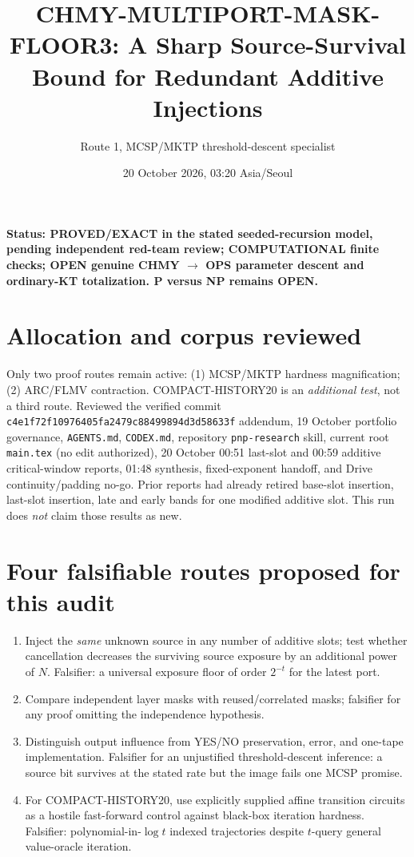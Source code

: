\documentclass[11pt]{article}
\title{CHMY-MULTIPORT-MASK-FLOOR3: A Sharp Source-Survival Bound for Redundant Additive Injections}
\author{Route 1, MCSP/MKTP threshold-descent specialist}
\date{20 October 2026, 03:20 Asia/Seoul}
\begin{document}
\maketitle
\noindent \textbf{Status: PROVED/EXACT in the stated seeded-recursion model, pending independent red-team review; COMPUTATIONAL finite checks; OPEN genuine CHMY $\to$ OPS parameter descent and ordinary-KT totalization. P versus NP remains OPEN.}

\section*{Allocation and corpus reviewed}
Only two proof routes remain active: (1) MCSP/MKTP hardness magnification; (2) ARC/FLMV contraction. COMPACT-HISTORY20 is an \emph{additional test}, not a third route. Reviewed the verified commit \texttt{c4e1f72f10976405fa2479c88499894d3d58633f} addendum, 19 October portfolio governance, \texttt{AGENTS.md}, \texttt{CODEX.md}, repository \texttt{pnp-research} skill, current root \texttt{main.tex} (no edit authorized), 20 October 00:51 last-slot and 00:59 additive critical-window reports, 01:48 synthesis, fixed-exponent handoff, and Drive continuity/padding no-go. Prior reports had already retired base-slot insertion, last-slot insertion, late and early bands for one modified additive slot. This run does \emph{not} claim those results as new.

\section*{Four falsifiable routes proposed for this audit}
\begin{enumerate}
\item Inject the \emph{same} unknown source in any number of additive slots; test whether cancellation decreases the surviving source exposure by an additional power of $N$. Falsifier: a universal exposure floor of order $2^{-t}$ for the latest port.
\item Compare independent layer masks with reused/correlated masks; falsifier for any proof omitting the independence hypothesis.
\item Distinguish output influence from YES/NO preservation, error, and one-tape implementation. Falsifier for an unjustified threshold-descent inference: a source bit survives at the stated rate but the image fails one MCSP promise.
\item For COMPACT-HISTORY20, use explicitly supplied affine transition circuits as a hostile fast-forward control against black-box iteration hardness. Falsifier: polynomial-in-$\log t$ indexed trajectories despite $t$-query general value-oracle iteration.
\end{enumerate}
\end{document}
